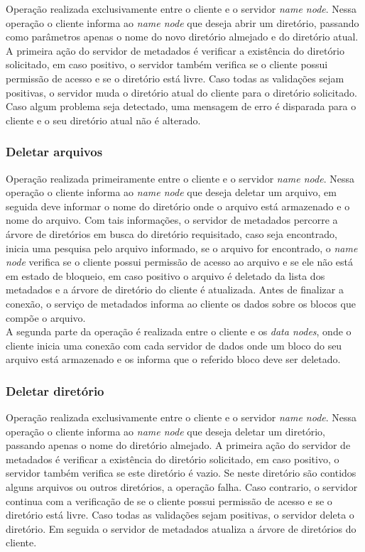 Operação realizada exclusivamente entre o cliente e o servidor \textit{name node}. Nessa operação o cliente informa ao \textit{name node} que deseja abrir um diretório, passando como parâmetros apenas o nome do novo diretório almejado e do diretório atual. A primeira ação do servidor de metadados é verificar a existência do diretório solicitado, em caso positivo, o servidor também verifica se o cliente possui permissão de acesso e se o diretório está livre. Caso todas as validações sejam positivas, o servidor muda o diretório atual do cliente para o diretório solicitado. Caso algum problema seja detectado, uma mensagem de erro é disparada para o cliente e o seu diretório atual não é alterado.
\\


\subsubsection{Deletar arquivos}

Operação realizada primeiramente entre o cliente e o servidor \textit{name node}. Nessa operação o cliente informa ao \textit{name node} que deseja deletar um arquivo, em seguida deve informar o nome do diretório onde o arquivo está armazenado e o nome do arquivo. Com tais informações, o servidor de metadados percorre a árvore de diretórios em busca do diretório requisitado, caso seja encontrado, inicia uma pesquisa pelo arquivo informado, se o arquivo for encontrado, o \textit{name node} verifica se o cliente possui permissão de acesso ao arquivo e se ele não está em estado de bloqueio, em caso positivo o arquivo é deletado da lista dos metadados e a árvore de diretório do cliente é atualizada. Antes de finalizar a conexão, o serviço de metadados informa ao cliente os dados sobre os blocos que compõe o arquivo.
\\

A segunda parte da operação é realizada entre o cliente e os \textit{data nodes}, onde o cliente inicia uma conexão com cada servidor de dados onde um bloco do seu arquivo está armazenado e os informa que o referido bloco deve ser deletado.
\\

\subsubsection{Deletar diretório}

Operação realizada exclusivamente entre o cliente e o servidor \textit{name node}. Nessa operação o cliente informa ao \textit{name node} que deseja deletar um diretório, passando apenas o nome do diretório almejado. A primeira ação do servidor de metadados é verificar a existência do diretório solicitado, em caso positivo, o servidor também verifica se este diretório é vazio. Se neste diretório são contidos alguns arquivos ou outros diretórios, a operação falha.
Caso contrario, o servidor continua com a verificação de se o cliente possui permissão de acesso e se o diretório está livre. Caso todas as validações sejam positivas, o servidor deleta o diretório. Em seguida o servidor de metadados atualiza a árvore de diretórios do cliente.
\\

